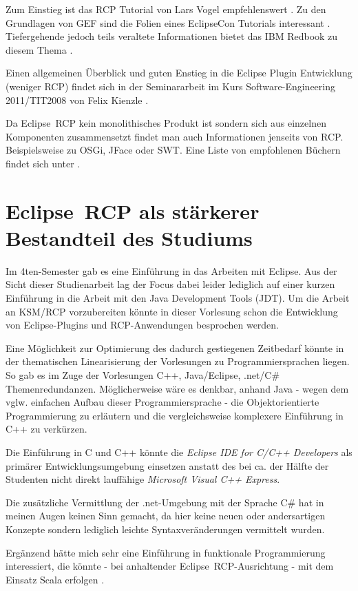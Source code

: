 \documentclass[%
12pt,titlepage,abstracton,DIV=10]{scrreprt}
\begin{document}
Zum Einstieg ist das RCP Tutorial von Lars Vogel empfehlenswert \cite{vogelrcp}.
Zu den Grundlagen von GEF sind die Folien eines EclipseCon Tutorials interessant
\cite{gefslides}. Tiefergehende jedoch teils veraltete Informationen bietet
das IBM Redbook zu diesem Thema \cite{gefredbook}.

Einen allgemeinen Überblick und guten Enstieg in die Eclipse Plugin Entwicklung
(weniger RCP) findet sich in der Seminararbeit im Kurs Software-Engineering
2011/\textsc{TIT2008} von Felix Kienzle \cite{kienzle11}.

Da Eclipse~RCP kein monolithisches Produkt ist sondern sich aus einzelnen
Komponenten zusammensetzt findet man auch Informationen jenseits von RCP.
Beispielsweise zu OSGi\cite{bartlett}, JFace\cite{jfaceaction} oder SWT. Eine
Liste von empfohlenen Büchern findet sich unter \cite{eclipse-read}.

\section{Eclipse~RCP als stärkerer Bestandteil des Studiums}
Im 4ten-Semester gab es eine Einführung in das Arbeiten mit Eclipse. Aus der
Sicht dieser Studienarbeit lag der Focus dabei leider lediglich auf einer
kurzen Einführung in die Arbeit mit den Java Development Tools (JDT).
Um die Arbeit an KSM/RCP vorzubereiten könnte in dieser Vorlesung schon die
Entwicklung von Eclipse-Plugins und RCP-Anwendungen besprochen werden.

Eine Möglichkeit zur Optimierung des dadurch gestiegenen Zeitbedarf könnte in
der thematischen Linearisierung der Vorlesungen zu Programmiersprachen liegen.
So gab es im Zuge der Vorlesungen C++, Java/Eclipse, .net/C\#
 Themenredundanzen. Möglicherweise wäre es denkbar, anhand Java -
 wegen dem vglw. einfachen Aufbau
dieser Programmiersprache - die Objektorientierte Programmierung zu erläutern
und die vergleichsweise komplexere Einführung in C++ zu verkürzen.

Die Einführung in C und C++ könnte die \textit{Eclipse IDE for
C/C++ Developers} als primärer Entwicklungsumgebung einsetzen anstatt des bei
ca. der Hälfte der Studenten nicht direkt lauffähige \textit{Microsoft Visual
C++ Express}.

Die zusätzliche Vermittlung der .net-Umgebung mit der Sprache C\# hat in meinen
Augen keinen Sinn gemacht, da hier keine neuen oder andersartigen Konzepte
sondern lediglich leichte Syntaxveränderungen vermittelt wurden.

Ergänzend hätte mich sehr eine Einführung in funktionale Programmierung
interessiert, die könnte - bei anhaltender Eclipse~RCP-Ausrichtung - mit dem
Einsatz Scala erfolgen \cite{eclipse:scalabundle}\cite{eclipse:scalarcp}.
\end{document}
